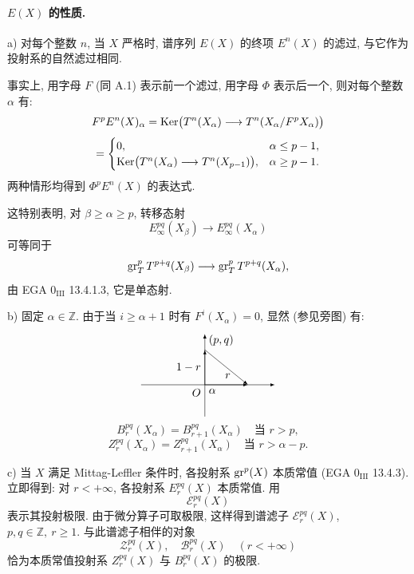 \paragraph{\(E(X)\) 的性质.}
a) 对每个整数 \(n\), 当 \(X\) 严格时, 谱序列 \(E(X)\) 的终项 \(E^n(X)\) 的滤过, 与它作为投射系的自然滤过相同.

事实上, 用字母 \(F\) (同 A.1) 表示前一个滤过, 用字母 \(\Phi\) 表示后一个, 则对每个整数 \(\alpha\) 有:
\[
F^pE^n(X)_\alpha
=\operatorname{Ker}\bigl(T^n(X_\alpha)\longrightarrow T^n(X_\alpha/F^pX_\alpha)\bigr)
\]
\[
=
\begin{cases}
0,& \alpha\le p-1,\\
\operatorname{Ker}\bigl(T^n(X_\alpha)\longrightarrow T^n(X_{p-1})\bigr),& \alpha\ge p-1.
\end{cases}
\]
两种情形均得到 \(\Phi^pE^n(X)\) 的表达式.

这特别表明, 对 \(\beta\ge\alpha\ge p\), 转移态射
\[
E_\infty^{pq}(X_\beta)\longrightarrow E_\infty^{pq}(X_\alpha)
\]
可等同于
\[
\operatorname{gr}_T^pT^{p+q}(X_\beta)\longrightarrow
\operatorname{gr}_T^pT^{p+q}(X_\alpha),
\]
由 EGA \(0_{\mathrm{III}}\) 13.4.1.3, 它是单态射.

b) 固定 \(\alpha\in\mathbb Z\). 由于当 \(i\ge\alpha+1\) 时有 \(F^i(X_\alpha)=0\), 显然 (参见旁图) 有:
\[
\begin{tikzpicture}[baseline=(current bounding box.center),x=1.0cm,y=1.0cm,>=latex]
\draw[->] (-2.0,0) -- (2.2,0);
\draw[->] (0,-1.0) -- (0,1.6);
\node[below left] at (0,0) {$O$};
\node[below right] at (0,0) {$\alpha$};
\draw[->] (0,0) -- (0,1.1);
\draw[->] (0,1.1) -- (1.35,0);
\draw[->] (0,0) -- (1.35,0);
\node[above right] at (0,1.1) {$(p,q)$};
\node[left] at (0,0.55) {$1-r$};
\node[above] at (.72,0.08) {$r$};
\end{tikzpicture}
\]
\[
B_r^{pq}(X_\alpha)=B_{r+1}^{pq}(X_\alpha)\quad\text{当 }r>p,
\]
\[
Z_r^{pq}(X_\alpha)=Z_{r+1}^{pq}(X_\alpha)\quad\text{当 }r>\alpha-p.
\]

c) 当 \(X\) 满足 Mittag-Leffler 条件时, 各投射系 \(\operatorname{gr}^p(X)\) 本质常值 (EGA \(0_{\mathrm{III}}\) 13.4.3). 立即得到: 对 \(r<+\infty\), 各投射系 \(E_r^{pq}(X)\) 本质常值. 用
\[
\mathcal E_r^{pq}(X)
\]
表示其投射极限. 由于微分算子可取极限, 这样得到谱滤子 \(\mathcal E_r^{pq}(X)\), \(p,q\in\mathbb Z,\ r\ge1\). 与此谱滤子相伴的对象
\[
\mathcal Z_r^{pq}(X),\quad \mathcal B_r^{pq}(X)\quad(r<+\infty)
\]
恰为本质常值投射系 \(Z_r^{pq}(X)\) 与 \(B_r^{pq}(X)\) 的极限.

